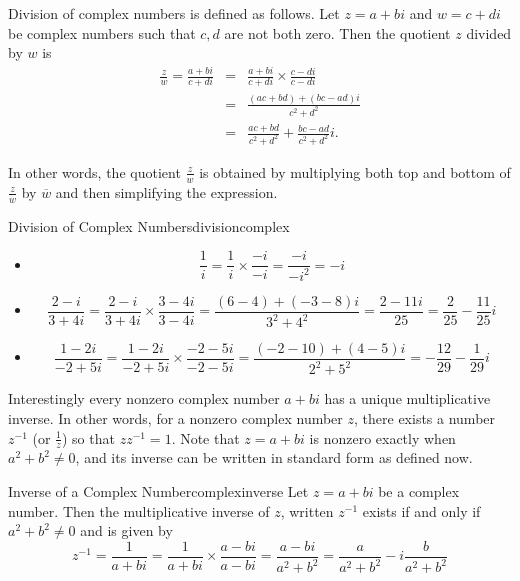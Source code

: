 Division of complex numbers is defined as follows. Let $z=a+bi$ and $w=c+di$ be complex numbers such that $c,d$ are not both zero. Then the quotient $z$ divided by $w$ is
\begin{eqnarray*}
\frac{z}{w}=
\frac{a+bi}{c+di} & = & \frac{a+bi}{c+di}\times \frac{c-di}{c-di} \\
& = & \frac{(ac+bd)+(bc-ad)i}{c^2+d^2} \\
& = & \frac{ac+bd}{c^2+d^2} +\frac{bc-ad}{c^2+d^2}i.
\end{eqnarray*}

In other words, the quotient $\frac{z}{w}$ is obtained by multiplying
both top and bottom of $\frac{z}{w}$ by $\overline{w}$ and
then simplifying the expression.

\begin{example}{Division of Complex Numbers}{divisioncomplex}
\begin{itemize}
\item
\[ \frac{1}{i} = \frac{1}{i}\times \frac{-i}{-i}
=\frac{-i}{-i^2}=-i \]

\item
\[ \frac{2-i}{3+4i} = \frac{2-i}{3+4i}\times \frac{3-4i}{3-4i}
=\frac{(6-4)+(-3-8)i}{3^2+4^2}
=\frac{2-11i}{25}
=\frac{2}{25} - \frac{11}{25}i \]

\item

\[ \frac{1-2i}{-2+5i} = \frac{1-2i}{-2+5i}\times \frac{-2-5i}{-2-5i}
=\frac{(-2-10) + (4-5)i}{2^2+5^2}
=-\frac{12}{29}-\frac{1}{29}i  \]
\end{itemize}
\end{example}

Interestingly every nonzero complex number $a+bi$ has a unique
multiplicative inverse. In other words, for a nonzero complex number
$z$, there exists a number $z^{-1}$ (or $\frac{1}{z}$) so that
$zz^{-1} = 1$. Note that $z=a+bi$ is nonzero exactly when
$a^{2}+b^{2}\neq 0$, and its inverse can be written in standard form as defined now. 

\begin{definition}{Inverse of a Complex Number}{complexinverse}
Let $z = a+bi$ be a complex number. Then the multiplicative inverse of $z$, written $z^{-1}$ exists if and only if $a^{2}+b^{2}\neq 0$ and is given by 
\begin{equation*}
z^{-1} = \frac{1}{a+bi}  = \frac{1}{a+bi}\times \frac{a-bi}{a-bi}=\frac{a-bi}{a^{2}+b^{2}}=\frac{a}{a^{2}+b^{2}}-i\frac{b}{
a^{2}+b^{2}}
\end{equation*}
\end{definition}

